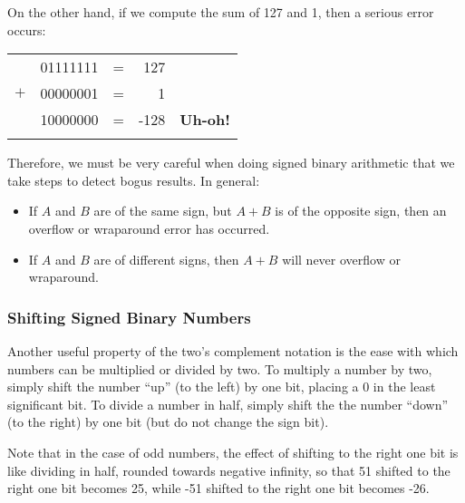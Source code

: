 On the other hand, if we compute the sum of 127 and 1, then
a serious error occurs:

\begin{tabular}{llcrl}
        \\
        &       01111111        & = & 127       &       \\
  $+$   &       00000001        & = & 1         &       \\
\hline
        &       10000000        & = & -128      & {\bf Uh-oh!}  \\
        \\
\end{tabular}

Therefore, we must be very careful when doing signed binary arithmetic
that we take steps to detect bogus results.
In general:
\begin{itemize}
\item   If $A$ and $B$ are of the same sign, but $A + B$ is of
        the opposite sign, then an overflow or wraparound error
        has occurred.
\item   If $A$ and $B$ are of different signs, then $A + B$ will
        never overflow or wraparound.
\end{itemize}

\subsubsection{Shifting Signed Binary Numbers}

Another useful property of the two's complement notation
is the ease with which numbers can be multiplied or divided by
two.  To multiply a number by two, simply shift the number ``up''
(to the left) by one bit, placing a 0 in the least significant bit.
To divide a number in half, simply shift the the number ``down''
(to the right) by one bit (but do not change the sign bit).

Note that in the case of odd numbers, the effect of shifting
to the right one bit is like dividing in half, rounded towards
negative infinity, so that 51 shifted to the right one bit becomes 25,
while -51 shifted to the right one bit becomes -26.

